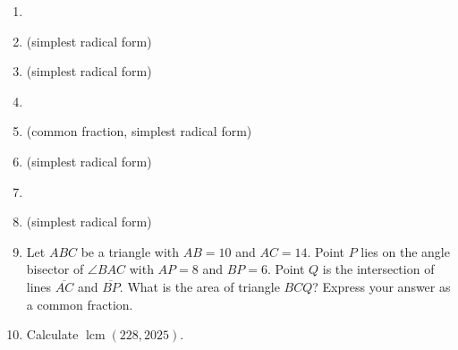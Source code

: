 \documentclass{article}
\begin{document}
\begin{enumerate}
\item \underline{\hspace{3in}}\vspace{1cm}
\item \underline{\hspace{3in}} (simplest radical form)\vspace{1cm}
\item \underline{\hspace{3in}} (simplest radical form)\vspace{1cm}
\item \underline{\hspace{3in}}\vspace{1cm}
\item \underline{\hspace{3in}} (common fraction, simplest radical form)\vspace{1cm}
\item \underline{\hspace{3in}} (simplest radical form)\vspace{1cm}
\item \underline{\hspace{3in}}\vspace{1cm}
\item \underline{\hspace{3in}} (simplest radical form)\vspace{1cm}
\item Let $ABC$ be a triangle with $AB = 10$ and $AC = 14$. Point $P$ lies on the angle bisector of $\angle BAC$ with $AP = 8$ and $BP = 6$. Point $Q$ is the intersection of lines $\overline{AC}$ and $\overline{BP}$. What is the area of triangle $BCQ$? Express your answer as a common fraction.
\vspace{1cm}
\item Calculate $\operatorname{lcm}(228,2025)$.
\end{enumerate}


\newpage
\end{document}
